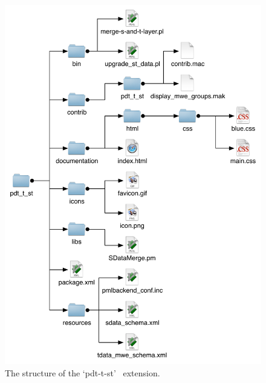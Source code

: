 

\vspace{2cm}


\begin{figure}[htbp]
   \centering
   \includegraphics[width=\textwidth]{images/extension-structure} 
   \caption{The structure of the `pdt-t-st' \tred\ extension.}
   \label{fig:tred-ext}
\end{figure}

